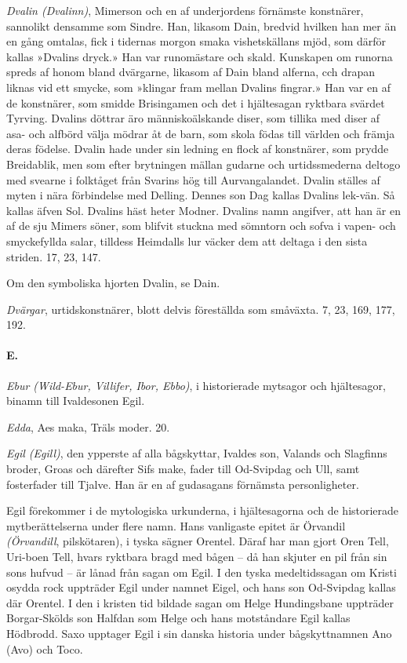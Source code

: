 \emph{Dvalin (Dvalinn)}, Mimerson och en af underjordens förnämste
konstnärer, sannolikt densamme som Sindre. Han, likasom Dain, bredvid
hvilken han mer än en gång omtalas, fick i tidernas morgon smaka
vishetskällans mjöd, som därför kallas »Dvalins dryck.» Han var
runomästare och skald. Kunskapen om runorna spreds af honom bland
dvärgarne, likasom af Dain bland alferna, cch drapan liknas vid ett
smycke, som »klingar fram mellan Dvalins fingrar.» Han var en af de
konstnärer, som smidde Brisingamen och det i hjältesagan ryktbara
svärdet Tyrving. Dvalins döttrar äro människoälskande diser, som tillika
med diser af asa- och alfbörd välja mödrar åt de barn, som skola födas
till världen och främja deras födelse. Dvalin hade under sin ledning
\protect\hypertarget{lb1625905.xhtmlux5cux23start211}{}{}\protect\hypertarget{lb1625905.xhtmlux5cux23start211-a}{}{}\protect\hypertarget{lb1625905.xhtmlux5cux23start211-b}{}{}\protect\hypertarget{lb1625905.xhtmlux5cux23start211-c}{}{}\protect\hypertarget{lb1625905.xhtmlux5cux23start211-d}{}{}
en flock af konstnärer, som prydde Breidablik, men som efter brytningen
mällan gudarne och urtidssmederna deltogo med svearne i folktåget från
Svarins hög till Aurvangalandet. Dvalin ställes af myten i nära
förbindelse med Delling. Dennes son Dag kallas Dvalins lek-vän. Så
kallas äfven Sol. Dvalins häst heter Modner. Dvalins namn angifver, att
han är en af de sju Mimers söner, som blifvit stuckna med sömntorn och
sofva i vapen- och smyckefyllda salar, tilldess Heimdalls lur väcker dem
att deltaga i den sista striden. 17, 23, 147.

Om den symboliska hjorten Dvalin, se Dain.

\emph{Dvärgar}, urtidskonstnärer, blott delvis föreställda som småväxta.
7, 23, 169, 177, 192.

\paragraph{E.}

\emph{Ebur (Wild-Ebur, Villifer, Ibor, Ebbo)}, i historierade mytsagor
och hjältesagor, binamn till Ivaldesonen Egil.

\emph{Edda}, Aes maka, Träls moder. 20.

\emph{Egil (Egill)}, den ypperste af alla bågskyttar, Ivaldes son,
Valands och Slagfinns broder, Groas och därefter Sifs make, fader till
Od-Svipdag och Ull, samt fosterfader till Tjalve. Han är en af
gudasagans förnämsta personligheter.

Egil förekommer i de mytologiska urkunderna, i hjältesagorna och de
historierade mytberättelserna under flere namn. Hans vanligaste epitet
är Örvandil \emph{(Örvandill}, pilskötaren), i tyska sägner Orentel.
Däraf har man gjort Oren Tell, Uri-boen Tell, hvars ryktbara bragd med
bågen -- då han skjuter en pil från sin sons hufvud -- är lånad från
sagan om Egil. I den tyska medeltidssagan om Kristi osydda rock
uppträder Egil under namnet Eigel, och hans son Od-Svipdag kallas där
Orentel. I den i kristen tid bildade sagan om Helge Hundingsbane
uppträder Borgar-Skölds son Halfdan som Helge och hans motståndare Egil
kallas Hödbrodd. Saxo upptager Egil i sin danska historia under
bågskyttnamnen Ano (Avo) och Toco.

